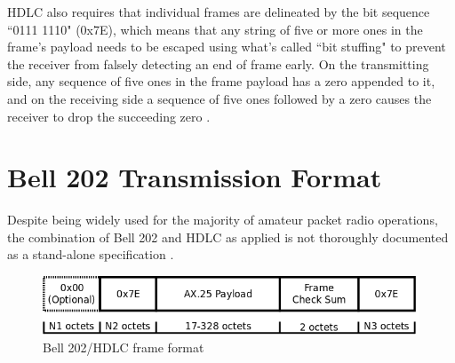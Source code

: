 \documentclass[12pt,letterpaper]{article}
\begin{document}
HDLC also requires that individual frames are delineated by the bit sequence
``0111 1110" (0x7E), which means that any string of five or more ones in the
frame's payload needs to be escaped using what's called ``bit stuffing"
to prevent the receiver from falsely detecting an end of frame early.
On the transmitting side, any sequence of five ones in the frame payload
has a zero appended to it, and on the receiving side a sequence of
five ones followed by a zero causes the receiver to 
drop the succeeding zero \cite[\S3.6]{ax25spec}.


\section{Bell 202 Transmission Format}

Despite being widely used for the majority of amateur packet radio operations, 
the combination of Bell 202 and HDLC as applied is not thoroughly documented 
as a stand-alone specification \cite{n1vgphy}\cite{aprsunveiled}.

\begin{figure}
	\centering
	\includegraphics[width=1.0\textwidth]{src/dia/bell202}
	\caption{Bell 202/HDLC frame format}
	\label{fig:bell202format}
\end{figure}
\end{document}
